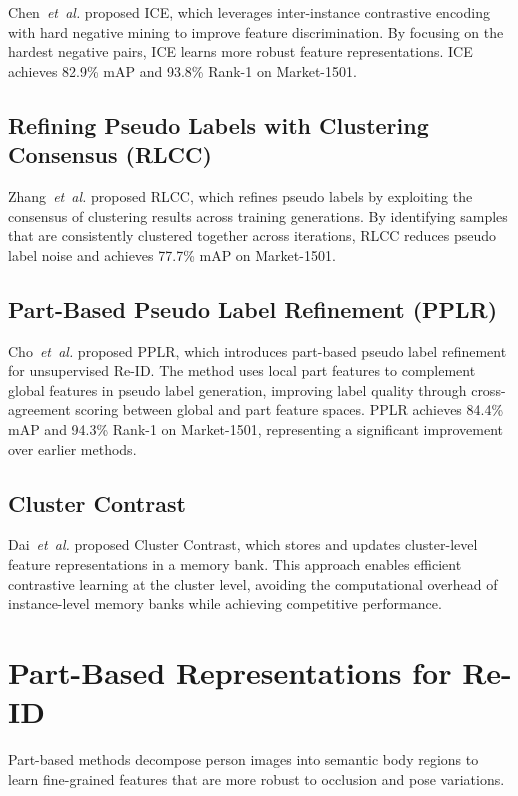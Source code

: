 Chen~\textit{et~al.} \cite{chen2021ice} proposed ICE, which leverages inter-instance contrastive encoding with hard negative mining to improve feature discrimination. By focusing on the hardest negative pairs, ICE learns more robust feature representations. ICE achieves 82.9\% mAP and 93.8\% Rank-1 on Market-1501.

\subsection{Refining Pseudo Labels with Clustering Consensus (RLCC)}

Zhang~\textit{et~al.} \cite{zhang2021rlcc} proposed RLCC, which refines pseudo labels by exploiting the consensus of clustering results across training generations. By identifying samples that are consistently clustered together across iterations, RLCC reduces pseudo label noise and achieves 77.7\% mAP on Market-1501.

\subsection{Part-Based Pseudo Label Refinement (PPLR)}

Cho~\textit{et~al.} \cite{cho2022pplr} proposed PPLR, which introduces part-based pseudo label refinement for unsupervised Re-ID. The method uses local part features to complement global features in pseudo label generation, improving label quality through cross-agreement scoring between global and part feature spaces. PPLR achieves 84.4\% mAP and 94.3\% Rank-1 on Market-1501, representing a significant improvement over earlier methods.

\subsection{Cluster Contrast}

Dai~\textit{et~al.} \cite{dai2022cluster} proposed Cluster Contrast, which stores and updates cluster-level feature representations in a memory bank. This approach enables efficient contrastive learning at the cluster level, avoiding the computational overhead of instance-level memory banks while achieving competitive performance.

\section{Part-Based Representations for Re-ID}

Part-based methods decompose person images into semantic body regions to learn fine-grained features that are more robust to occlusion and pose variations.

